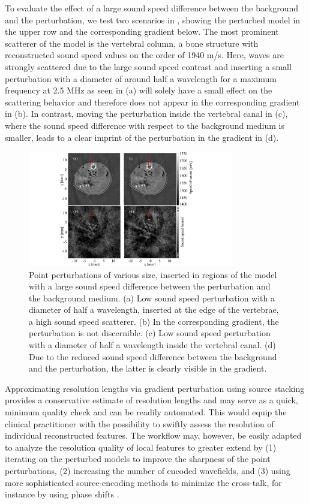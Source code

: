 \documentclass[12pt]{iopart}
\begin{document}
To evaluate the effect of a large sound speed difference between the background and the perturbation, we test two scenarios in , showing the perturbed model in the upper row and the corresponding gradient below. The most prominent scatterer of the model is the vertebral column, a bone structure with reconstructed sound speed values on the order of 1940 m/s. Here, waves are strongly scattered due to the large sound speed contrast and inserting a small perturbation with a diameter of around half a wavelength for a maximum frequency at 2.5 MHz as seen in (a) will solely have a small effect on the scattering behavior and therefore does not appear in the corresponding gradient in (b). In contrast, moving the perturbation inside the vertebral canal in (c), where the sound speed difference with respect to the background medium is smaller, leads to a clear imprint of the perturbation in the gradient in (d).  
 \begin{figure}[!h]
    \centering
    \includegraphics[width=0.8\textwidth]{figure8.pdf}
    \caption{Point perturbations of various size, inserted in regions of the model with a large sound speed difference between the perturbation and the background medium. (a) Low sound speed perturbation with a diameter of half a wavelength, inserted at the edge of the vertebrae, a high sound speed scatterer. (b) In the corresponding gradient, the perturbation is not discernible. (c) Low sound speed perturbation with a diameter of half a wavelength inside the vertebral canal. (d) Due to the reduced sound speed difference between the background and the perturbation, the latter is clearly visible in the gradient.}
    \label{fig:Vertebrae_perturbation}
\end{figure}
Approximating resolution lengths via gradient perturbation using source stacking provides a conservative estimate of resolution lengths and may serve as a quick, minimum quality check and can be readily automated. This would equip the clinical practitioner with the possibility to swiftly assess the resolution of individual reconstructed features. The workflow may, however, be easily adapted to analyze the resolution quality of local features to greater extend by (1) iterating on the perturbed models to improve the sharpness of the point perturbations, (2) increasing the number of encoded wavefields, and (3) using more sophisticated source-encoding methods to minimize the cross-talk, for instance by using phase shifts \cite{Tromp_Bachmann_medicalEncoding_2020}. 
\end{document}

